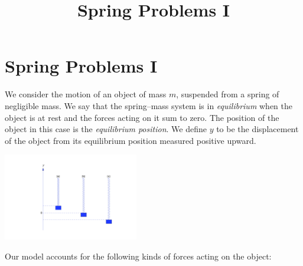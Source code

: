 \documentclass{ximera}
\title{Spring Problems I}
\begin{document}
\begin{abstract}

\end{abstract}

\maketitle

\section*{Spring Problems I}


We consider the motion of an object of mass $m$, suspended from a
spring of negligible mass. We say that the spring--mass system is
in \textit{equilibrium} when the object is at rest and the forces
acting on it sum to zero. The position of the object in this case is
the \textit{equilibrium position}. We define $y$ to be the displacement
of the object from its equilibrium position %
measured positive upward.

\begin{image}
  \includegraphics[height=1.5in]{fig060101.jpg} 
\end{image}

Our model accounts for the following kinds of forces acting on the
object:
\end{document}
